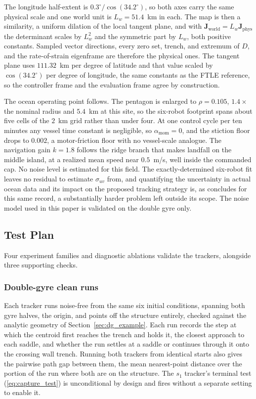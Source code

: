 \documentclass[lettersize,journal]{IEEEtran}
\begin{document}
The longitude half-extent is $0.3^{\circ}/\cos(34.2^{\circ})$, so both
axes carry the same physical scale and one world unit is $L_w = 51.4$~km in
each. The map is then a similarity, a uniform dilation of the local
tangent plane, and with $\mathbf{J}_{\mathrm{world}} = L_w
\mathbf{J}_{\mathrm{phys}}$ the determinant scales by $L_w^2$ and the
symmetric part by $L_w$, both positive constants. Sampled vector
directions, every zero set, trench, and extremum of $D$, and the
rate-of-strain eigenframe are therefore the physical ones. The tangent plane uses $111.32$~km per degree of
latitude and that value scaled by $\cos(34.2^{\circ})$ per degree of
longitude, the same constants as the FTLE reference, so the controller
frame and the evaluation frame agree by construction.

The ocean operating point follows. The pentagon is enlarged to $\rho = 0.105$,
$1.4\times$ the nominal radius and $5.4$~km at this site, so the
six-robot footprint spans about five cells of the $2$~km grid rather
than under four. At one control cycle per ten minutes any vessel time
constant is negligible, so $\alpha_{\text{mom}} = 0$, and the stiction
floor drops to $0.002$, a motor-friction floor with no vessel-scale
analogue. The navigation gain $k = 1.8$ follows the ridge branch that
makes landfall on the middle island, at a realized mean speed near
$0.5$~m/s, well inside the commanded cap. No noise level is estimated
for this field. The exactly-determined six-robot fit leaves no residual
to estimate $\sigma_{uv}$ from, and quantifying the uncertainty in
actual ocean data and its impact on the proposed tracking strategy is,
as \cite{17} concludes for this same record, a substantially harder
problem left outside its scope. The noise model used in this paper is
validated on the double gyre only.

\subsection{Test Plan}
\label{sec:test_plan}

Four experiment families and diagnostic ablations validate the trackers, alongside three
supporting checks.

\subsubsection{Double-gyre clean runs}
Each tracker runs noise-free from the same six initial conditions,
spanning both gyre halves, the origin, and points off the structure
entirely, checked against the analytic geometry of Section~\ref{sec:dg_example}. Each
run records the step at which the
centroid first reaches the trench and holds it, the closest approach to
each saddle, and whether the run settles at a saddle or continues
through it onto the crossing wall trench. Running both trackers from
identical starts also gives the pairwise path gap between them, the mean
nearest-point distance over the portion of the run where both are on the
structure. The $s_1$ tracker's terminal test (\ref{eq:capture_test}) is
unconditional by design and fires without a separate setting to enable it.
\end{document}
